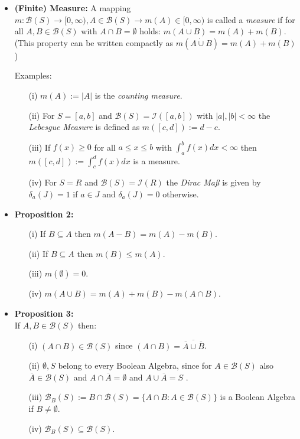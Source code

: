 \begin{itemize}

\item {\bf (Finite) Measure:} A mapping $m: \mathcal{B}(S) \rightarrow [0, \infty), A\in  \mathcal{B}(S) \to m(A) \in [0, \infty)$ is called a {\it measure} if for all $A,B \in \mathcal{B}(S)$ with $A\cap B = \emptyset$ holds: $m(A\cup B) = m(A) + m(B)$.\\(This property can be written compactly as $m(A\dot\cup B) = m(A) + m(B)$)

Examples:
\begin{itemize}
\item[(i)] $m(A) := |A|$ is the {\it counting measure}.
\item[(ii)] For $S=[a,b]$ and $\mathcal{B}(S)=\mathcal{I}([a,b])$ with $|a|, |b| < \infty$ the {\it Lebesgue Measure} is defined as $m([c, d]) := d-c$.
\item[(iii)] If $f(x) \ge 0$ for all $a \le x \le b$ with $\int_a^b f(x) dx <\infty$ then $m([c, d]) := \int_c^d f(x) dx $ is a measure.
\item[(iv)] For $S=R$ and $\mathcal{B}(S)=\mathcal{I}(R)$ the {\it Dirac Ma\ss} is given by $\delta_a(J) = 1$ if $a\in J$ and $\delta_a(J) = 0$ otherwise.
\end{itemize}

\item {\bf Proposition 2:} 
\begin{itemize}
\item[(i)] If $B\subseteq A$ then $m(A-B) = m(A) - m(B)$.
\item[(ii)] If $B\subseteq A$ then $m(B) \le m(A)$.
\item[(iii)] $m(\emptyset) =0$.
\item[(iv)] $m(A \cup B) = m(A) + m(B) - m(A\cap B)$.
\end{itemize}

\item {\bf Proposition 3:}\\
If $A,B \in \mathcal{B}(S)$ then:
\begin{itemize}
\item[(i)] $ (A \cap B) \in \mathcal{B}(S)$ since $ (A \cap B) = \overline{\overline{A} \cup \overline{B}}$.
\item[(ii)] $\emptyset, S$ belong to every Boolean Algebra, since for $A \in \mathcal{B}(S)$ also $\overline{A} \in \mathcal{B}(S)$ and $A \cap \overline{A} = \emptyset$ and $A\cup \overline{A} = S$ .
\item[(iii)] $\mathcal{B}_B(S) := B \cap \mathcal{B}(S) = \{A \cap B: A \in \mathcal{B}(S)\}$ is a Boolean Algebra if $B\ne \emptyset$.
\item[(iv)] $\mathcal{B}_B(S) \subseteq \mathcal{B}(S)$. 
\end{itemize}



\end{itemize}
